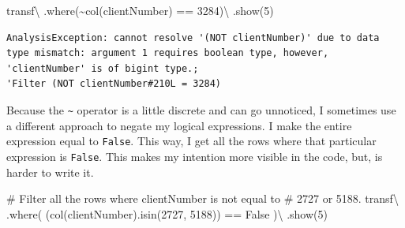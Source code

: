 \documentclass[
  11pt,
  letterpaper,
  DIV=11,
  numbers=noendperiod]{scrreprt}
\newenvironment{Shaded}{\begin{snugshade}}{\end{snugshade}}
\newcommand{\CommentTok}[1]{\textcolor[rgb]{0.37,0.37,0.37}{#1}}
\newcommand{\DecValTok}[1]{\textcolor[rgb]{0.68,0.00,0.00}{#1}}
\newcommand{\NormalTok}[1]{\textcolor[rgb]{0.00,0.23,0.31}{#1}}
\newcommand{\OperatorTok}[1]{\textcolor[rgb]{0.37,0.37,0.37}{#1}}
\newcommand{\StringTok}[1]{\textcolor[rgb]{0.13,0.47,0.30}{#1}}
\newcommand{\VariableTok}[1]{\textcolor[rgb]{0.07,0.07,0.07}{#1}}
\begin{document}
\begin{Shaded}
\begin{Highlighting}[]
\NormalTok{transf}\OperatorTok{\textbackslash{}}
\NormalTok{  .where(}\OperatorTok{\textasciitilde{}}\NormalTok{col(}\StringTok{\textquotesingle{}clientNumber\textquotesingle{}}\NormalTok{) }\OperatorTok{==} \DecValTok{3284}\NormalTok{)}\OperatorTok{\textbackslash{}}
\NormalTok{  .show(}\DecValTok{5}\NormalTok{)}
\end{Highlighting}
\end{Shaded}

\begin{verbatim}
AnalysisException: cannot resolve '(NOT clientNumber)' due to data type mismatch: argument 1 requires boolean type, however, 'clientNumber' is of bigint type.;
'Filter (NOT clientNumber#210L = 3284)
\end{verbatim}

Because the \texttt{\textasciitilde{}} operator is a little discrete and
can go unnoticed, I sometimes use a different approach to negate my
logical expressions. I make the entire expression equal to
\texttt{False}. This way, I get all the rows where that particular
expression is \texttt{False}. This makes my intention more visible in
the code, but, is harder to write it.

\begin{Shaded}
\begin{Highlighting}[]
\CommentTok{\# Filter all the rows where \textasciigrave{}clientNumber\textasciigrave{} is not equal to}
\CommentTok{\# 2727 or 5188.}
\NormalTok{transf}\OperatorTok{\textbackslash{}}
\NormalTok{  .where( (col(}\StringTok{\textquotesingle{}clientNumber\textquotesingle{}}\NormalTok{).isin(}\DecValTok{2727}\NormalTok{, }\DecValTok{5188}\NormalTok{)) }\OperatorTok{==} \VariableTok{False}\NormalTok{ )}\OperatorTok{\textbackslash{}}
\NormalTok{  .show(}\DecValTok{5}\NormalTok{)}
\end{Highlighting}
\end{Shaded}
\end{document}
